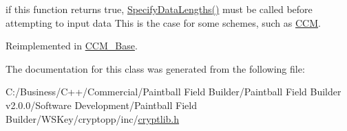 if this function returns true, \hyperlink{class_authenticated_symmetric_cipher_a7684bed45aa7e8b19de43fcb25b68c57}{SpecifyDataLengths()} must be called before attempting to input data This is the case for some schemes, such as \hyperlink{struct_c_c_m}{CCM}. 

Reimplemented in \hyperlink{class_c_c_m___base_a7738d2cc1969a72ee2693e49ace9565b}{CCM\_\-Base}.

The documentation for this class was generated from the following file:\begin{DoxyCompactItemize}
\item 
C:/Business/C++/Commercial/Paintball Field Builder/Paintball Field Builder v2.0.0/Software Development/Paintball Field Builder/WSKey/cryptopp/inc/\hyperlink{cryptlib_8h}{cryptlib.h}\end{DoxyCompactItemize}
